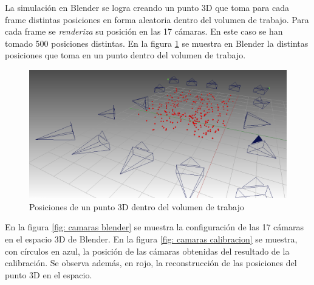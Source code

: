 La simulación en Blender se logra creando un punto 3D que toma para cada frame distintas posiciones en forma aleatoria dentro del volumen de trabajo. Para cada frame se \textit{renderiza} su posición en las 17 cámaras. En este caso se han tomado 500 posiciones distintas. En la figura \ref{fig: blender toolbox laser} se muestra en Blender la distintas posiciones que toma en un punto dentro del volumen de trabajo.

\begin{figure}[ht]
\begin{center}
\includegraphics[scale=0.22]{img/calibracion/blender_toolbox_laser.png}
\end{center}
\caption{Posiciones de un punto 3D dentro del volumen de trabajo}
\label{fig: blender toolbox laser}
\end{figure}

En la figura \ref{fig: camaras blender} se muestra la configuración de las 17 cámaras en el espacio 3D de Blender. En la figura \ref{fig: camaras calibracion} se muestra, con círculos en azul, la posición de las cámaras obtenidas del resultado de la calibración. Se observa además, en rojo, la reconstrucción de las posiciones del punto 3D en el espacio.


